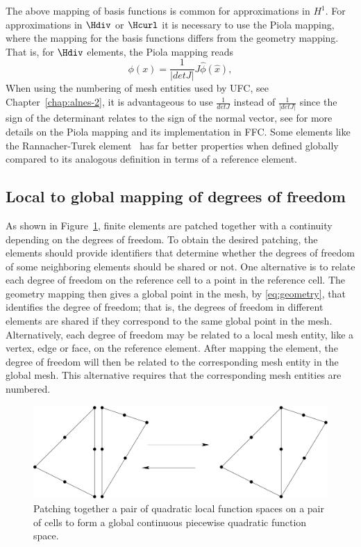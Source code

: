 The above mapping of basis functions is common for approximations in
$H^1$. For approximations in $\Hdiv$ or $\Hcurl$ it is necessary to use
the Piola mapping, where the mapping for the basis functions differs
from the geometry mapping. That is, for $\Hdiv$ elements, the Piola
mapping reads
\begin{equation}
\phi(x) = \frac{1}{|detJ|} J \hat{\phi}(\hat x),
\end{equation}
When using the numbering of mesh entities used by UFC, see
Chapter~\ref{chap:alnes-2}, it is advantageous to use $\frac{1}{detJ}$
instead of $\frac{1}{|detJ|}$ since the sign of the determinant relates
to the sign of the normal vector, see \citet{RognesKirbyLogg2009} for more
details on the Piola mapping and its implementation in FFC.  Some elements
like the Rannacher-Turek element~\citep{Turek1999,RannacherTurek1992}
has far better properties when defined globally compared to its analogous
definition in terms of a reference element.

\subsection{Local to global mapping of degrees of freedom}

As shown in Figure~\ref{fig:kirby-1:patch}, finite elements are
patched together with a continuity depending on the degrees of freedom.
To obtain the desired patching, the elements should provide identifiers
that determine whether the degrees of freedom of some neighboring
elements should be shared or not.  One alternative is to relate each
degree of freedom on the reference cell to a point in the reference
cell. The geometry mapping then gives a global point in the mesh, by
\eqref{eq:geometry}, that identifies the degree of freedom; that is, the
degrees of freedom in different elements are shared if they correspond to
the same global point in the mesh.  Alternatively, each degree of freedom
may be related to a local mesh entity, like a vertex, edge or face, on the
reference element. After mapping the element, the degree of freedom will
then be related to the corresponding mesh entity in the global mesh. This
alternative requires that the corresponding mesh entities are numbered.

\begin{figure}
  \begin{center}
    \includegraphics[width=\largefig]{chapters/kirby-1/pdf/patch.pdf}
    \caption{Patching together a pair of quadratic local function
      spaces on a pair of cells to form a global continuous
      piecewise quadratic function space.}
    \label{fig:kirby-1:patch}
  \end{center}
\end{figure}
